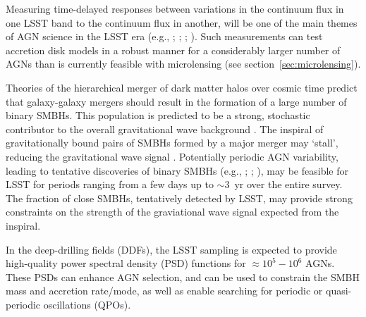 Measuring time-delayed responses between variations in the continuum flux
in one LSST band to the continuum flux in another, will be one of the
main themes of AGN science in the LSST era (e.g., \citet{Chelouche2013};
\citet{CheloucheandZucker2013}; \citet{EdelsonEtal2015}; \citet{FausnaughEtal2015}).
Such measurements can test accretion disk models in a robust manner
for a considerably larger number of AGNs than is currently feasible
with microlensing (see section~\ref{sec:microlensing}).

Theories of the hierarchical merger of dark matter halos over cosmic 
time predict that galaxy-galaxy mergers should result in the formation
of a large number of binary SMBHs. This population is predicted to be a strong,
stochastic contributor to the overall gravitational wave background
\citep{2015arXiv151105564T}. The inspiral of gravitationally bound pairs of
SMBHs formed by a major merger may `stall', reducing the gravitational wave
signal \citep{2014SSRv..183..189C}. Potentially periodic AGN variability,
leading to tentative discoveries of binary SMBHs (e.g.,
\citet{2015Natur.525..351D}; \citet{GrahamEtal2015}; \citet{LiuEtal2015}),
may be feasible for LSST for periods ranging from a few
days up to $\sim3$~yr over the entire survey. The fraction of close SMBHs,
tentatively detected by LSST, may provide strong constraints on the strength
of the graviational wave signal expected from the inspiral.

In the deep-drilling fields (DDFs), the LSST sampling is expected to provide
high-quality power spectral density (PSD) functions for $\approx10^{5} - 10^{6}$
AGNs. These PSDs can enhance AGN selection, and can be used to constrain the SMBH
mass and accretion rate/mode, as well as enable searching for periodic or
quasi-periodic oscillations (QPOs).
%
%



